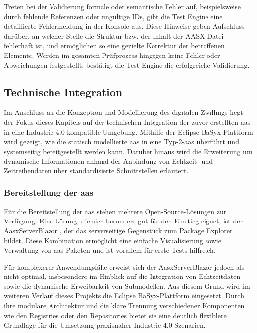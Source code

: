 Treten bei der Validierung formale oder semantische Fehler auf, beispielsweise durch fehlende Referenzen oder ungültige IDs, gibt die Test Engine eine detaillierte Fehlermeldung in der Konsole aus. 
Diese Hinweise geben Aufschluss darüber, an welcher Stelle die Struktur bzw. der Inhalt der AASX-Datei fehlerhaft ist, und ermöglichen so eine gezielte Korrektur der betroffenen Elemente. 
Werden im gesamten Prüfprozess hingegen keine Fehler oder Abweichungen festgestellt, bestätigt die Test Engine die erfolgreiche Validierung.

\subsection{Technische Integration}
Im Anschluss an die Konzeption und Modellierung des digitalen Zwillings liegt der Fokus dieses Kapitels auf der technischen Integration der zuvor erstellten \acs{aas} in eine Industrie 4.0-kompatible Umgebung. 
Mithilfe der Eclipse BaSyx-Plattform wird gezeigt, wie die statisch modellierte \acs{aas} in eine Typ-2-\acs{aas} überführt und systemseitig bereitgestellt werden kann. 
Darüber hinaus wird die Erweiterung um dynamische Informationen anhand der Anbindung von Echtzeit- und Zeitreihendaten über standardisierte Schnittstellen erläutert.

\subsubsection{Bereitstellung der \acs{aas}}
\label{sec:bereitstellungAAS}
Für die Bereitstellung der \acs{aas} stehen mehrere Open-Source-Lösungen zur Verfügung. 
Eine Lösung, die sich besonders gut für den Einstieg eignet, ist der AasxServerBlazor \cite{AASXServer}, der das serverseitige Gegenstück zum Package Explorer bildet. 
Diese Kombination ermöglicht eine einfache Visualisierung sowie Verwaltung von \acs{aas}-Paketen und ist vorallem für erste Tests hilfreich.

Für komplexerer Anwendungsfälle erweist sich der AasxServerBlazor jedoch als nicht optimal, insbesondere im Hinblick auf die Integration von Echtzeitdaten sowie die dynamische Erweibarkeit von Submodellen.
Aus diesem Grund wird im weiteren Verlauf dieses Projekts die Eclipse BaSyx-Plattform eingesetzt.
Durch ihre modulare Architektur und die klare Trennung verschiedener Komponenten wie den Registries oder den Repositories bietet sie eine deutlich flexiblere Grundlage für die Umsetzung praxisnaher Industrie 4.0-Szenarien.

